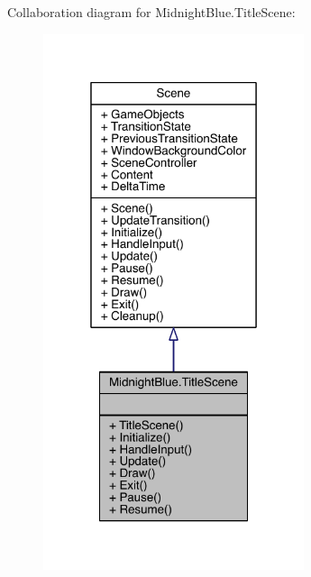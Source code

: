 Collaboration diagram for Midnight\+Blue.\+Title\+Scene\+:
\nopagebreak
\begin{figure}[H]
\begin{center}
\leavevmode
\includegraphics[width=217pt]{class_midnight_blue_1_1_title_scene__coll__graph}
\end{center}
\end{figure}
